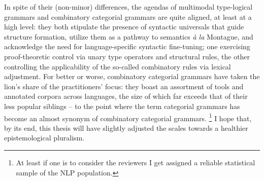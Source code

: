 In spite of their (non-minor) differences, the agendas of multimodal type-logical grammars and combinatory categorial grammars are quite aligned, at least at a high level: they both stipulate the presence of syntactic universals that guide structure formation, utilize them as a pathway to semantics \textit{\`{a} la} Montague, and acknowledge the need for language-specific syntactic fine-tuning; one exercising proof-theoretic control via unary type operators and structural rules, the other controlling the applicability of the so-called combinatory rules via lexical adjustment.
For better or worse, combinatory categorial grammars have taken the lion's share of the practitioners' focus: they boast an assortment of tools and annotated corpora across languages, the size of which far exceeds that of their less popular siblings -- to the point where the term categorial grammars has become an almost synonym of combinatory categorial grammars.%
\footnote{At least if one is to consider the reviewers I get assigned a reliable statistical sample of the NLP population.}
I hope that, by its end, this thesis will have slightly adjusted the scales towards a healthier epistemological pluralism.

